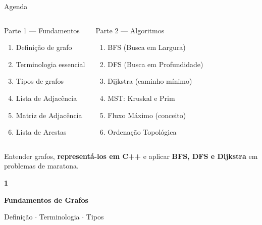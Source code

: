 \documentclass[aspectratio=169,10pt]{beamer}
\begin{document}
\begin{frame}{Agenda}
  \begin{columns}[t]
      \begin{block}{Parte 1 --- Fundamentos}
        \begin{enumerate}\footnotesize
          \item Definição de grafo
          \item Terminologia essencial
          \item Tipos de grafos
          \item Lista de Adjacência
          \item Matriz de Adjacência
          \item Lista de Arestas
        \end{enumerate}
      \end{block}
      \begin{block}{Parte 2 --- Algoritmos}
        \begin{enumerate}\footnotesize
          \item BFS (Busca em Largura)
          \item DFS (Busca em Profundidade)
          \item Dijkstra (caminho mínimo)
          \item MST: Kruskal e Prim
          \item Fluxo Máximo (conceito)
          \item Ordenação Topológica
        \end{enumerate}
      \end{block}
  \end{columns}
  \vspace{0.2cm}
  \begin{tcolorbox}[caixaAmarelo,title={Objetivo da aula}]
    \small
    Entender grafos, \textbf{representá-los em C++} e aplicar
    \textbf{BFS, DFS e Dijkstra} em problemas de maratona.
  \end{tcolorbox}
\end{frame}

{
\begin{frame}[noframenumbering]
  \centering\vspace{1.2cm}
  {\fontsize{38}{46}\selectfont\bfseries\color{gemaBlue} 1}\par
  \vspace{0.25cm}
  {\Large\color{graphColor}\bfseries Fundamentos de Grafos}\par
  \vspace{0.15cm}
  {\color{gray}\small Definição $\cdot$ Terminologia $\cdot$ Tipos}
\end{frame}
}
\end{document}
